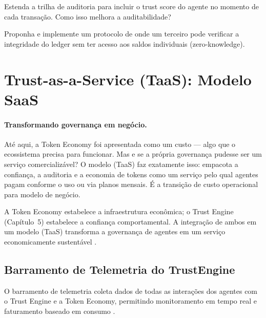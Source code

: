 \begin{exercicio}
Estenda a trilha de auditoria para incluir o trust score do
agente no momento de cada transação. Como isso melhora a
auditabilidade?
\end{exercicio}

\begin{exercicio}
Proponha e implemente um protocolo de  onde um terceiro pode verificar a integridade do
ledger sem ter acesso aos saldos individuais (zero-knowledge).
\end{exercicio}

\section{Trust-as-a-Service (TaaS): Modelo SaaS}
\label{sec:taas}
\nivelphd

\paragraph{Transformando governança em negócio.} Até aqui, a Token Economy foi apresentada como um custo --- algo que o ecossistema precisa para funcionar. Mas e se a própria governança pudesse ser um serviço comercializável? O modelo  (TaaS) faz exatamente isso: empacota a confiança, a auditoria e a economia de tokens como um serviço pelo qual agentes pagam conforme o uso ou via planos mensais. É a transição de custo operacional para modelo de negócio.

A Token Economy estabelece a infraestrutura econômica; o Trust
Engine (Capítulo~5) estabelece a confiança comportamental. A
integração de ambos em um modelo 
(TaaS) transforma a governança de agentes em um serviço
economicamente sustentável \cite{opencode2026token,
opencode2026ecosystem}.

\subsection{Barramento de Telemetria do TrustEngine}

O barramento de telemetria coleta dados de todas as interações
dos agentes com o Trust Engine e a Token Economy, permitindo
monitoramento em tempo real e faturamento baseado em consumo
\cite{opencode2026spec038}.

